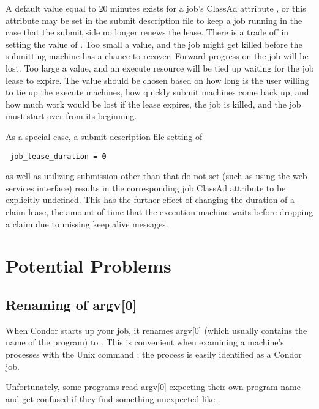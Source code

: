 A default value equal to 20 minutes exists for a job's
ClassAd attribute , 
or this attribute may be set in the submit description file
to keep a job running in the case that the submit side no longer
renews the lease.
There is a trade off in setting the value of . 
Too small a value,
and the job might get killed before the submitting machine has a
chance to recover.
Forward progress on the job will be lost.
Too large a value,
and an execute resource will be tied up waiting for the job lease to expire.
The value should be chosen based on how long is the user willing to tie up
the execute machines, how quickly submit machines come  back up,
and how much work would be lost if the lease expires,
the job is killed, and the job must start over from its beginning.

As a special case, a submit description file setting of
\begin{verbatim}
 job_lease_duration = 0
\end{verbatim}
as well as utilizing submission other than 
that do not set 
(such as using the web services interface)
results in the corresponding job ClassAd attribute to be explicitly
undefined.
This has the further effect of changing the duration of a claim lease,
the amount of time that the execution machine waits before
dropping a claim due to missing keep alive messages.

\section{Potential Problems}

\subsection{\label{sec:renaming-argv}Renaming of argv[0]}

When Condor starts up your job, it renames argv[0] (which usually
contains the name of the program) to .
This is
convenient when examining a machine's processes with the Unix
command ; the process
is easily identified as a Condor job.  

Unfortunately, some programs read argv[0] expecting their own program
name and get confused if they find something unexpected like
.

